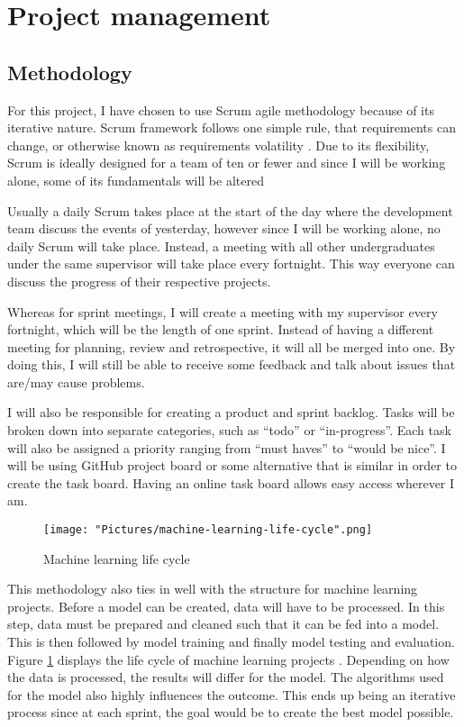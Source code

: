 \documentclass[11pt]{article}
\begin{document}
\newpage
\section{Project management}
\subsection{Methodology}
For this project, I have chosen to use Scrum agile methodology because of its iterative nature. Scrum framework follows one simple rule, that requirements can change, or otherwise known as requirements volatility \cite{methodology-requirement-volatile}. Due to its flexibility, Scrum is ideally designed for a team of ten or fewer \cite{methodology-ten-fewer} and since I will be working alone, some of its fundamentals will be altered

Usually a daily Scrum takes place at the start of the day where the development team discuss the events of yesterday, however since I will be working alone, no daily Scrum will take place. Instead, a meeting with all other undergraduates under the same supervisor will take place every fortnight. This way everyone can discuss the progress of their respective projects.

Whereas for sprint meetings, I will create a meeting with my supervisor every fortnight, which will be the length of one sprint. Instead of having a different meeting for planning, review and retrospective, it will all be merged into one. By doing this, I will still be able to receive some feedback and talk about issues that are/may cause problems.

I will also be responsible for creating a product and sprint backlog. Tasks will be broken down into separate categories, such as “todo” or “in-progress”. Each task will also be assigned a priority ranging from “must haves” to “would be nice”. I will be using GitHub project board \cite{methodology-github-projects} or some alternative that is similar in order to create the task board. Having an online task board allows easy access wherever I am. 

\begin{figure}[h!]
   \texttt{[image: "Pictures/machine-learning-life-cycle".png]}
   \caption{Machine learning life cycle}
   \label{fig:ml-life-cycle}
\end{figure}

This methodology also ties in well with the structure for machine learning projects. Before a model can be created, data will have to be processed. In this step, data must be prepared and cleaned such that it can be fed into a model. This is then followed by model training and finally model testing and evaluation. Figure \ref{fig:ml-life-cycle} displays the life cycle of machine learning projects \cite{methodology-ml-life-cycle}. Depending on how the data is processed, the results will differ for the model. The algorithms used for the model also highly influences the outcome. This ends up being an iterative process since at each sprint, the goal would be to create the best model possible. 
\end{document}
